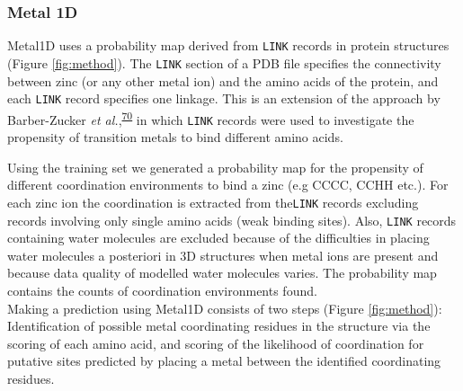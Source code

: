 \documentclass[  ASAPversion,
  ,
  9pt]{elife}
\begin{document}
\hypertarget{metal-1d}{%
\subsubsection{Metal 1D}\label{metal-1d}}

Metal1D uses a probability map derived from \texttt{LINK} records in protein structures (Figure \ref{fig:method}). The \texttt{LINK} section of a PDB file specifies the connectivity between zinc (or any other metal ion) and the amino acids of the protein, and each \texttt{LINK} record specifies one linkage. This is an extension of the approach by Barber-Zucker \emph{et al.},\textsuperscript{\protect\hyperlink{ref-FB5cckAJ}{70}} in which \texttt{LINK} records were used to investigate the propensity of transition metals to bind different amino acids.

Using the training set we generated a probability map for the propensity of different coordination environments to bind a zinc (e.g CCCC, CCHH etc.). For each zinc ion the coordination is extracted from the\texttt{LINK} records excluding records involving only single amino acids (weak binding sites). Also, \texttt{LINK} records containing water molecules are excluded because of the difficulties in placing water molecules a posteriori in 3D structures when metal ions are present and because data quality of modelled water molecules varies. The probability map contains the counts of coordination environments found. \\
Making a prediction using Metal1D consists of two steps (Figure \ref{fig:method}): Identification of possible metal coordinating residues in the structure via the scoring of each amino acid, and scoring of the likelihood of coordination for putative sites predicted by placing a metal between the identified coordinating residues.
\end{document}
